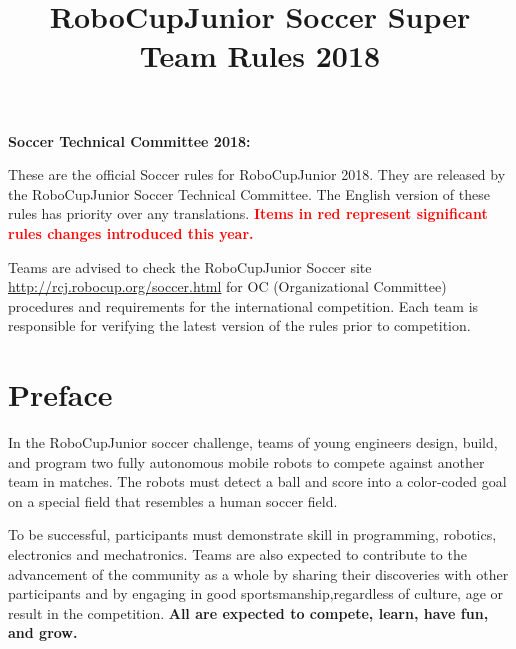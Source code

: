 \documentclass{article}
\title{\vspace{-5ex}RoboCupJunior Soccer Super Team Rules 2018\vspace{-5ex}}
\date{\vspace{-2ex}}
\begin{document}
\maketitle
\thispagestyle{firststyle}

\textbf{Soccer Technical Committee 2018:}


These are the official Soccer rules for RoboCupJunior 2018. They are released
by the RoboCupJunior Soccer Technical Committee. The English version of these
rules has priority over any translations. \textcolor{red}{\textbf{Items in red
represent significant rules changes introduced this year.}}

Teams are advised to check the RoboCupJunior Soccer site
\href{http://rcj.robocup.org/soccer.html}{http://rcj.robocup.org/soccer.html}
for OC (Organizational Committee) procedures and requirements for the
international competition. Each team is responsible for verifying the latest version of the
rules prior to competition.

\section*{Preface}

In the RoboCupJunior soccer challenge, teams of young engineers design, build,
and program two fully autonomous mobile robots to compete against another team
in matches. The robots must detect a ball and score into a color-coded goal on
a special field that resembles a human soccer field.

To be successful, participants must demonstrate skill in programming, robotics,
electronics and mechatronics.  Teams are also expected to contribute to the
advancement of the community as a whole by sharing their discoveries with other
participants and by engaging in good sportsmanship,regardless of culture, age or
result in the competition. \textbf{All are expected to compete,
learn, have fun, and grow.}
\end{document}
